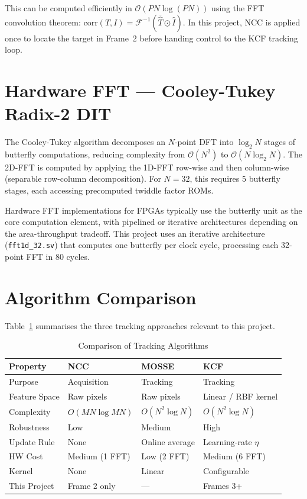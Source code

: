 \documentclass[a4paper,12pt]{report}
\begin{document}
\noindent This can be computed efficiently in $\mathcal{O}(PN \log(PN))$ using the FFT convolution theorem: $\text{corr}(T, I) = \mathcal{F}^{-1}(\overline{\hat{T}} \odot \hat{I})$. In this project, NCC is applied once to locate the target in Frame~2 before handing control to the KCF tracking loop.

\section{Hardware FFT --- Cooley-Tukey Radix-2 DIT}

The Cooley-Tukey algorithm \cite{cooleytukey1965} decomposes an $N$-point DFT into $\log_2 N$ stages of butterfly computations, reducing complexity from $\mathcal{O}(N^2)$ to $\mathcal{O}(N \log_2 N)$. The 2D-FFT is computed by applying the 1D-FFT row-wise and then column-wise (separable row-column decomposition). For $N = 32$, this requires 5 butterfly stages, each accessing precomputed twiddle factor ROMs.

\par Hardware FFT implementations for FPGAs typically use the butterfly unit as the core computation element, with pipelined or iterative architectures depending on the area-throughput tradeoff. This project uses an iterative architecture (\texttt{fft1d\_32.sv}) that computes one butterfly per clock cycle, processing each 32-point FFT in 80 cycles.

\section{Algorithm Comparison}

Table~\ref{tab:algo_compare} summarises the three tracking approaches relevant to this project.

\begin{table}[ht]
\centering
\caption{Comparison of Tracking Algorithms}
\vspace{0.2cm}
\label{tab:algo_compare}
\begin{tabular}{|l|l|l|l|}
\hline
\textbf{Property} & \textbf{NCC} & \textbf{MOSSE} & \textbf{KCF} \\ \hline
Purpose & Acquisition & Tracking & Tracking \\ \hline
Feature Space & Raw pixels & Raw pixels & Linear / RBF kernel \\ \hline
Complexity & $O(MN \log MN)$ & $O(N^2 \log N)$ & $O(N^2 \log N)$ \\ \hline
Robustness & Low & Medium & High \\ \hline
Update Rule & None & Online average & Learning-rate $\eta$ \\ \hline
HW Cost & Medium (1 FFT) & Low (2 FFT) & Medium (6 FFT) \\ \hline
Kernel & None & Linear & Configurable \\ \hline
This Project & Frame 2 only & --- & Frames 3+ \\ \hline
\end{tabular}
\end{table}
\end{document}
